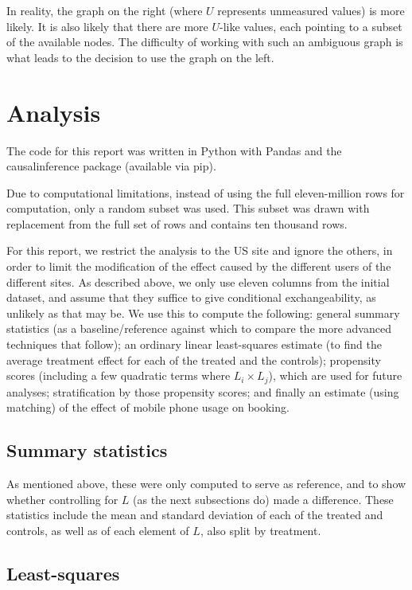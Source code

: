 \documentclass{article}
\begin{document}
In reality, the graph on the right (where $U$ represents unmeasured values) is
more likely.  It is also likely that there are more $U$-like values, each
pointing to a subset of the available nodes.  The difficulty of working with
such an ambiguous graph is what leads to the decision to use the graph on the
left.

\section{Analysis} %

The code for this report was written in Python with Pandas and the
causalinference package (available via pip).

Due to computational limitations, instead of using the full eleven-million rows
for computation, only a random subset was used.  This subset was drawn with
replacement from the full set of rows and contains ten thousand rows.

For this report, we restrict the analysis to the US site and ignore the others,
in order to limit the modification of the effect caused by the different users
of the different sites.  As described above, we only use eleven columns from the
initial dataset, and assume that they suffice to give conditional
exchangeability, as unlikely as that may be.  We use this to compute the
following: general summary statistics (as a baseline/reference against which to
compare the more advanced techniques that follow); an ordinary linear
least-squares estimate (to find the average treatment effect for each of the
treated and the controls); propensity scores (including a few quadratic terms
where $L_i\times L_j$), which are used for future analyses; stratification by
those propensity scores; and finally an estimate (using matching) of
the effect of mobile phone usage on booking.

\subsection{Summary statistics}

As mentioned above, these were only computed to serve as reference, and to show
whether controlling for $L$ (as the next subsections do) made a difference.
These statistics include the mean and standard deviation of each of the treated
and controls, as well as of each element of $L$, also split by treatment.

\subsection{Least-squares}
\end{document}
